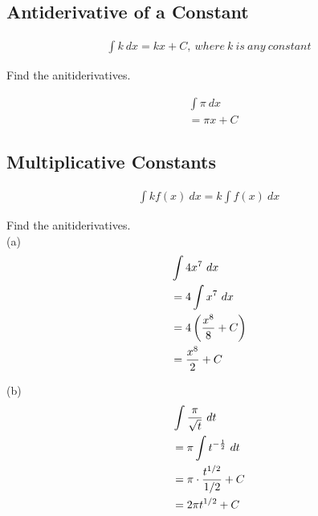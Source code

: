 \subsection{Antiderivative of a Constant}

\begin{theorem}
    \begin{align}
        \int k \ dx = kx + C,\ where\ k\ is\ any\ constant
    \end{align}
\end{theorem}

\begin{exercise}\nonumber
    Find the anitiderivatives.

    \begin{align}
         & \int \pi \ dx \\
         & = \pi x + C
    \end{align}
\end{exercise}

\subsection{Multiplicative Constants}

\begin{theorem}
    \begin{align}
        \int kf(x) \ dx = k \int f(x) \ dx
    \end{align}
\end{theorem}

\begin{exercise}\nonumber
    Find the anitiderivatives. \\

    (a)
    \begin{align}
         & \int 4x^7 \ dx                    \\
         & = 4 \int x^7 \ dx                 \\
         & = 4\left({x^8 \over 8} + C\right) \\
         & = {x^8 \over 2} + C               \\
    \end{align}

    (b)
    \begin{align}
         & \int {\pi \over \sqrt{t}} \ dt      \\
         & = \pi \int t^{-{1 \over 2}} \ dt    \\
         & = \pi \cdot {t^{1/2} \over 1/2} + C \\
         & = 2\pi t^{1/2} + C
    \end{align}
\end{exercise}

